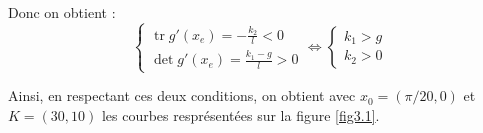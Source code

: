 \documentclass[a4paper]{article}
\DeclareMathOperator{\tr}{tr}   %
\begin{document}
                        Donc on obtient :
                        $$
                        \begin{cases}
                                \tr g'(x_e) = -\frac{k_2}{l} < 0 \\
                                \det g'(x_e) = \frac{k_1-g}{l} > 0
                        \end{cases}
                        \Longleftrightarrow
                        \begin{cases}
                                k_1 > g \\
                                k_2 > 0
                        \end{cases}
                        $$
                        \vspace{10pt}

                        Ainsi, en respectant ces deux conditions, on obtient avec $x_0=(\pi/20,0)$ et $K=(30,10)$ 
                        les courbes resprésentées sur la figure \ref{fig3.1}.
\end{document}

